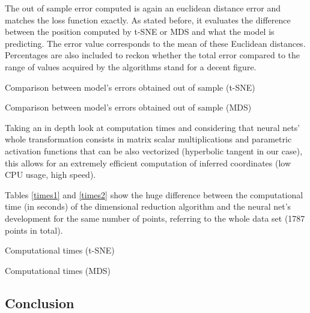 \documentclass[a4paper,11pt,spanish]{report}
\begin{document}
The out of sample error computed is again an euclidean distance error and matches the loss function exactly. As stated before, it evaluates the difference between the position computed by t-SNE or MDS and what the model is predicting. The error value corresponds to the mean of these Euclidean distances. Percentages are also included to reckon whether the total error compared to the range of values acquired by the algorithms stand for a decent figure.

\begin{table}[p]
\vspace{20px}
\centering

\caption{\label{metrics1}Comparison between model's errors obtained out of sample (t-SNE)}
\end{table}

\begin{table}[p]
\vspace{20px}
\centering

\caption{\label{metrics2}Comparison between model's errors obtained out of sample (MDS)}
\end{table}

Taking an in depth look at computation times and considering that neural nets' whole transformation consists in matrix scalar multiplications and parametric activation functions that can be also vectorized (hyperbolic tangent in our case), this allows for an extremely efficient computation of inferred coordinates (low CPU usage, high speed).

Tables \ref{times1} and \ref{times2} show the huge difference between the computational time (in seconds) of the dimensional reduction algorithm and the neural net's development for the same number of points, referring to the whole data set (1787 points in total).

\begin{table}[h]
\centering

\caption{\label{times1}Computational times (t-SNE)}
\end{table}

\begin{table}[h]
\centering

\caption{\label{times2}Computational times (MDS)}
\end{table}

\subsection{Conclusion}
\label{ssec:conc1}
\end{document}
